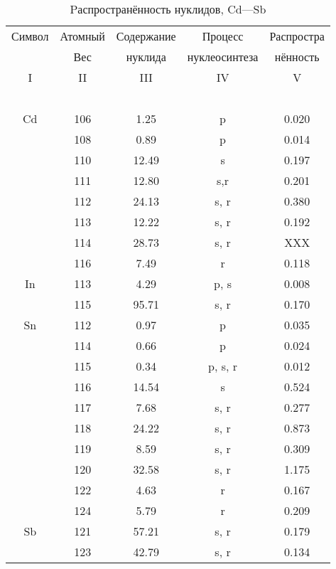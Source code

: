 \documentclass[a5paper,openany]{book}
\begin{document}
\begin{table}[h!]
	{\small
		\begin{tabular}{ccccc}
			Символ  & Атомный &  Содержание  & Процесс & Распростра   \\
			~ & Вес &  нуклида  &  нуклеосинтеза  & нённость  \\
			\hline 
			I & II &  III  & IV & V \\
			\hline 
			~ & ~ & ~ & ~ & ~  \\
			Cd & 106 & 1.25 & p & 0.020 \\ [1mm]
			& 108 & 0.89 & p & 0.014 \\ [1mm] 
			& 110 &  12.49 & s & 0.197 \\ [1mm]  			
			& 111 & 12.80 & s,r & 0.201 \\ [1mm]			
			& 112 & 24.13 & s, r & 0.380 \\ [1mm]			
			& 113 & 12.22 & s, r & 0.192 \\ [1mm]				
			& 114 & 28.73 & s, r & XXX \\ [1mm]			
			& 116 & 7.49 & r & 0.118 \\ [1mm]
			In & 113 & 4.29 & p, s & 0.008 \\ [1mm]
			& 115 &  95.71 & s, r & 0.170 \\ [1mm]  			
			Sn & 112 & 0.97 & p & 0.035 \\ [1mm]
			& 114 & 0.66 & p & 0.024 \\ [1mm] 
			& 115 &  0.34 & p, s, r & 0.012 \\ [1mm]  			
			& 116 & 14.54 & s & 0.524 \\ [1mm]			
			& 117 & 7.68 & s, r & 0.277 \\ [1mm]			
			& 118 & 24.22 & s, r & 0.873 \\ [1mm]				
			& 119 & 8.59 & s, r & 0.309 \\ [1mm]			
			& 120 & 32.58 & s, r & 1.175 \\ [1mm]
			& 122 & 4.63 & r & 0.167 \\ [1mm]			
			& 124 & 5.79 & r & 0.209 \\ [1mm]
			Sb & 121 & 57.21 & s, r & 0.179 \\ [1mm]		
			& 123 & 42.79 & s, r & 0.134 \\ [1mm]		
			\hline 
		\end{tabular}
	}
	\caption{Pаспространённость нуклидов, Cd---Sb}
	\label{t:AbudanceSolarCdSb}
\end{table}
\end{document}
